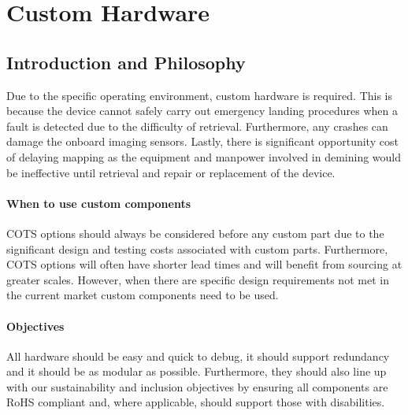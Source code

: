 \newpage
{}
\section{Custom Hardware} \label{section:Custom Hardware}
\subsection{Introduction and Philosophy}
Due to the specific operating environment, custom hardware is required. This is because the device cannot safely carry out emergency landing procedures when a fault is detected due to the difficulty of retrieval. Furthermore, any crashes can damage the onboard imaging sensors. Lastly, there is significant opportunity cost of delaying mapping as the equipment and manpower involved in demining would be ineffective until retrieval and repair or replacement of the device. 
\paragraph{When to use custom components}
\gls{COTS} options should always be considered before any custom part due to the significant design and testing costs associated with custom parts. Furthermore, \gls{COTS} options will often have shorter lead times and will benefit from sourcing at greater scales. However, when there are specific design requirements not met in the current market custom components need to be used.
\paragraph{Objectives}
All hardware should be easy and quick to debug, it should support redundancy and it should be as modular as possible. Furthermore, they should also line up with our sustainability and inclusion objectives by ensuring all components are \gls{RoHS} compliant and, where applicable, should support those with disabilities.



